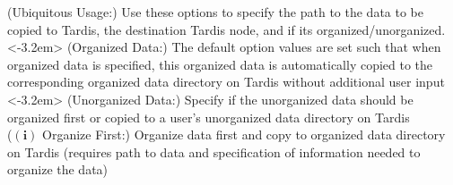 \clearpage
\begin{tcbcode}[type=details, title=add\_tardis\_data]
    \tcbfunctiondesc(Ubiquitous Usage:)
    {
    	Use these options to specify the path to the data to be copied to Tardis, the destination Tardis node, and if its 	organized/unorganized.%
    }%
    \tcbfunctionsep%
    \\[-0.25em]%
    \tcbcodehline<-3.2em>
    \tcbfunctiondesc(Organized Data:)
    {%
        The default option values are set such that when organized data is specified, this organized data is automatically copied to the corresponding organized data directory on Tardis without additional user input
    }\\[-1.0em]
    \tcbcodehline<-3.2em>
    \tcbfunctiondesc(Unorganized Data:)
        {Specify if the unorganized data should be organized first or copied to a user's unorganized data directory on Tardis}%
    \tcbfunctionsep%
    \\[-0.8em]
    \tcbfunctiondesc($\boldsymbol{(i)}$ Organize First:)
        {Organize data first and copy to organized data directory on Tardis (requires path to data and specification of information needed to organize the data)}%

\end{tcbcode}
